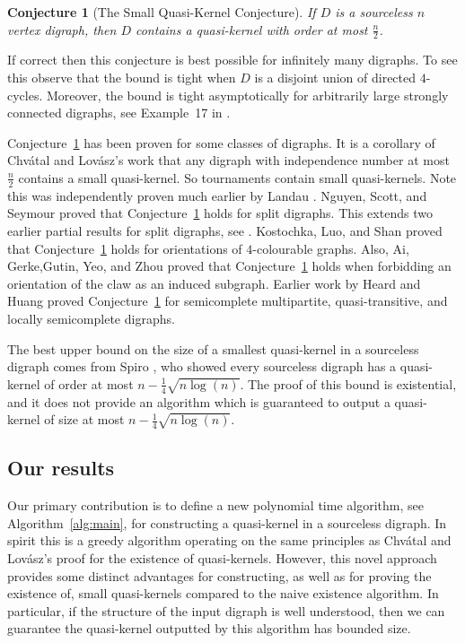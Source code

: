 \documentclass[12pt]{article}
\newtheorem{conjecture}[theorem]{Conjecture}
\theoremstyle{definition}
\begin{document}
\begin{conjecture}[The Small Quasi-Kernel Conjecture]\label{Conj: small quasi}
 If $D$ is a sourceless $n$ vertex digraph, then
$D$ contains a quasi-kernel with order at most $\frac{n}{2}$.
\end{conjecture}


If correct then this conjecture is best possible for infinitely many digraphs.
To see this observe that the bound is tight when $D$ is a disjoint union of directed $4$-cycles.
Moreover, the bound is tight asymptotically for arbitrarily large strongly connected digraphs, 
see Example~17 in \cite{erdHos2025small}.

Conjecture~\ref{Conj: small quasi} has been proven for some classes of digraphs.
It is a corollary of Chv\'atal and Lov\'asz's work that any digraph with independence number at most $\frac{n}{2}$ contains a small quasi-kernel.
So
tournaments contain small quasi-kernels.
Note this was independently proven much earlier by 
Landau \cite{landau1953dominance}.
Nguyen, Scott, and Seymour \cite{nguyen2024distant}
proved that Conjecture~\ref{Conj: small quasi} holds for split digraphs.
This extends two earlier partial results for split digraphs, see \cite{ai2023results,langlois2025quasi}.
Kostochka, Luo, and Shan \cite{kostochka2022towards}
proved that Conjecture~\ref{Conj: small quasi} holds
for orientations of $4$-colourable graphs.
Also, Ai, Gerke,Gutin, Yeo, and Zhou \cite{ai2023results} proved that Conjecture~\ref{Conj: small quasi} holds 
when forbidding an orientation of the claw as an induced subgraph.
Earlier work by Heard and Huang \cite{heard2008disjoint} proved Conjecture~\ref{Conj: small quasi}
for semicomplete multipartite, quasi-transitive, and locally semicomplete
digraphs.


The best upper bound on the size of a smallest quasi-kernel in a sourceless digraph
comes from Spiro \cite{spiro2024generalized}, who showed every sourceless digraph has a quasi-kernel
of order at most $n - \frac{1}{4}\sqrt{n\log(n)}$.
The proof of this bound is existential, and it does not provide an algorithm which is guaranteed
to output a quasi-kernel of size at most $n - \frac{1}{4}\sqrt{n\log(n)}$.


\subsection{Our results}

Our primary contribution
is to define a new polynomial time algorithm, see Algorithm~\ref{alg:main}, for constructing a quasi-kernel in a sourceless digraph.
In spirit this is a greedy 
algorithm operating on the same principles as
Chv\'atal and Lov\'asz's proof for the existence of quasi-kernels.
However, this novel approach provides some distinct advantages 
for constructing, as well as 
for proving the existence of, small quasi-kernels
compared to the naive existence algorithm.
In particular,
if the structure of the input digraph is well understood, 
then we can guarantee the quasi-kernel outputted by this algorithm has bounded size.
\end{document}
